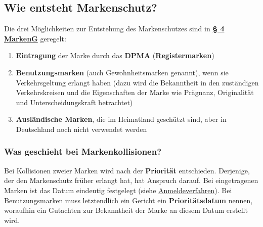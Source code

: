 \documentclass[12pt,A4]{extarticle}
\newcommand{\highlight}[1]{\textcolor{highlightColor}{\textbf{#1}}}
\newcommand{\markenG}[2][]{\textbf{\textcolor{markenGesetzLink}{\href{https://www.gesetze-im-internet.de/markeng/__#2.html}{§ #2 \ifthenelse{\equal{#1}{}}{}{#1 }MarkenG}}}}
\begin{document}
\subsection{Wie entsteht Markenschutz?}
Die drei Möglichkeiten zur Entstehung des Markenschutzes sind in \markenG{4} geregelt:
\begin{enumerate}
  \item{\highlight{Eintragung} der Marke durch das \textbf{DPMA} (\textbf{Registermarken})}
  \item{\highlight{Benutzungsmarken} (auch Gewohnheitsmarken genannt), wenn sie Verkehrsgeltung erlangt haben (dazu wird die Bekanntheit in den zuständigen Verkehrskreisen und die Eigenschaften der Marke wie Prägnanz, Originalität und Unterscheidungskraft betrachtet)}
  \item{\textbf{Ausländische Marken}, die im Heimatland geschützt sind, aber in Deutschland noch nicht verwendet werden}
\end{enumerate}

\subsubsection{Was geschieht bei Markenkollisionen?}
Bei Kollisionen zweier Marken wird nach der \highlight{Priorität} entschieden. Derjenige, der den Markenschutz früher erlangt hat, hat Anspruch darauf.
Bei eingetragenen Marken ist das Datum eindeutig festgelegt (siehe \hyperref[sec:Anmeldeverfahren]{Anmeldeverfahren}).
Bei Benutzungsmarken muss letztendlich ein Gericht ein \textbf{Prioritätsdatum} nennen, woraufhin ein Gutachten zur Bekanntheit der Marke an diesem Datum erstellt wird.
\end{document}

